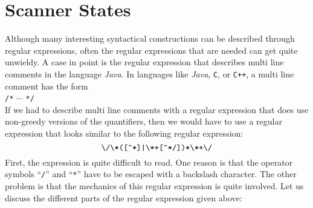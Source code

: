 \section{Scanner States}
Although many interesting syntactical constructions can be described through regular expressions, often
the regular expressions that are needed can get quite unwieldy.  A case in point is the regular
expression that describes multi line comments in the language \textsl{Java}.  In languages like
\textsl{Java}, \texttt{C}, or \texttt{C++}, a multi line comment has the form
\\[0.2cm]
\hspace*{1.3cm}
\texttt{/*} $\cdots$ \texttt{*/}
\\[0.2cm]
If we had to describe multi line comments with a regular expression that does use non-greedy versions of the
quantifiers,
then we would have to use a regular expression that looks similar to the following regular expression:
\begin{equation}
  \label{eq:multiline-comment}
\texttt{\symbol{92}/\symbol{92}*([\symbol{94}*]|\symbol{92}*+[\symbol{94}*/])*\symbol{92}*+\symbol{92}/}  
\end{equation}
First, the expression is quite difficult to read.  One reason is that the operator symbols
``\texttt{/}'' and ``\texttt{*}'' have to be escaped with a backslash character.  The other problem
is that the mechanics of this regular expression is quite involved.  Let us discuss the different
parts of the regular expression given above:

